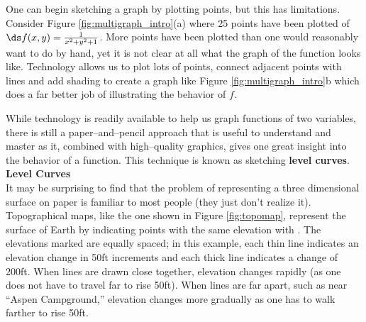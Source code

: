 One can begin sketching a graph by plotting points, but this has limitations. Consider Figure \ref{fig:multigraph_intro}(a) where 25 points have been plotted of $\ds f(x,y) = \frac1{x^2+y^2+1}$. More points have been plotted than one would reasonably want to do by hand, yet it is not clear at all what the graph of the function looks like. Technology allows us to plot lots of points, connect adjacent points with lines and add shading to create a graph like Figure \ref{fig:multigraph_intro}b which does a far better job of illustrating the behavior of $f$.

While technology is readily available to help us graph functions of two variables, there is still a paper--and--pencil approach that is useful to understand and master as it, combined with high--quality graphics, gives one great insight into the behavior of a function. This technique is known as sketching \textbf{level curves}.\\

\noindent\textbf{\large Level Curves}\\

It may be surprising to find that the problem of representing a three dimensional surface on paper is familiar to most people (they just don't realize it). Topographical maps, like the one shown in Figure \ref{fig:topomap}, represent the surface of Earth by indicating points with the same elevation with . The elevations marked are equally spaced; in this example, each thin line indicates an elevation change in 50ft increments and each thick line indicates a change of 200ft. When lines are drawn close together, elevation changes rapidly (as one does not have to travel far to rise 50ft). When lines are far apart, such as near ``Aspen Campground,'' elevation changes more gradually as one has to walk farther to rise 50ft.


